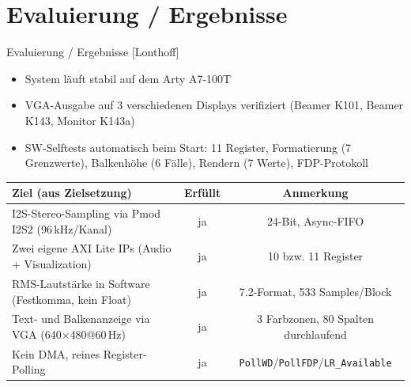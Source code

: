 \section{Evaluierung / Ergebnisse}
\begin{frame}{Evaluierung / Ergebnisse [Lonthoff]}
    \begin{itemize}
        \item System läuft stabil auf dem Arty A7-100T
        \item VGA-Ausgabe auf 3 verschiedenen Displays verifiziert (Beamer K101, Beamer K143, Monitor K143a)
        \item SW-Selftests automatisch beim Start: 11 Register, Formatierung (7 Grenzwerte), Balkenhöhe (6 Fälle), Rendern (7 Werte), FDP-Protokoll
    \end{itemize}

    \vspace{0.2em}
    \begin{table}
        \centering
        \footnotesize
        \begin{tabularx}{\textwidth}{Xcc}
            \toprule
            \textbf{Ziel (aus Zielsetzung)} & \textbf{Erfüllt} & \textbf{Anmerkung} \\
            \midrule
            I2S-Stereo-Sampling via Pmod I2S2 (96\,kHz/Kanal) & ja & 24-Bit, Async-FIFO \\
            Zwei eigene AXI Lite IPs (Audio + Visualization) & ja & 10 bzw. 11 Register \\
            RMS-Lautstärke in Software (Festkomma, kein Float) & ja & 7.2-Format, 533 Samples/Block \\
            Text- und Balkenanzeige via VGA (640$\times$480@60\,Hz) & ja & 3 Farbzonen, 80 Spalten durchlaufend \\
            Kein DMA, reines Register-Polling & ja & \texttt{PollWD}/\texttt{PollFDP}/\texttt{L\/R\_Available} \\
            \bottomrule
        \end{tabularx}
    \end{table}
\end{frame}